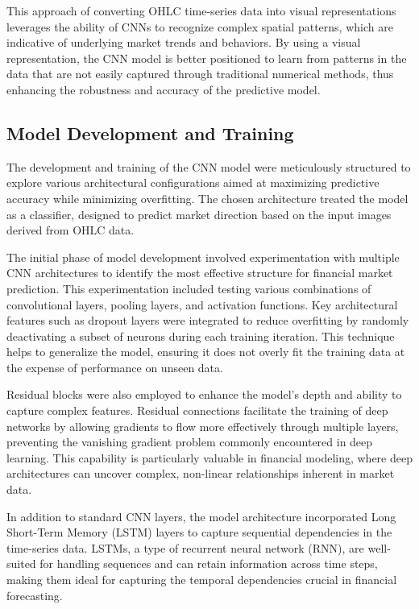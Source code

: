This approach of converting OHLC time-series data into visual representations leverages the ability of CNNs to recognize complex spatial patterns, which are indicative of underlying market trends and behaviors. By using a visual representation, the CNN model is better positioned to learn from patterns in the data that are not easily captured through traditional numerical methods, thus enhancing the robustness and accuracy of the predictive model.

\subsection{Model Development and Training}

The development and training of the CNN model were meticulously structured to explore various architectural configurations aimed at maximizing predictive accuracy while minimizing overfitting. The chosen architecture treated the model as a classifier, designed to predict market direction based on the input images derived from OHLC data.

The initial phase of model development involved experimentation with multiple CNN architectures to identify the most effective structure for financial market prediction. This experimentation included testing various combinations of convolutional layers, pooling layers, and activation functions. Key architectural features such as dropout layers were integrated to reduce overfitting by randomly deactivating a subset of neurons during each training iteration. This technique helps to generalize the model, ensuring it does not overly fit the training data at the expense of performance on unseen data.

Residual blocks were also employed to enhance the model's depth and ability to capture complex features. Residual connections facilitate the training of deep networks by allowing gradients to flow more effectively through multiple layers, preventing the vanishing gradient problem commonly encountered in deep learning. This capability is particularly valuable in financial modeling, where deep architectures can uncover complex, non-linear relationships inherent in market data.

In addition to standard CNN layers, the model architecture incorporated Long Short-Term Memory (LSTM) layers to capture sequential dependencies in the time-series data. LSTMs, a type of recurrent neural network (RNN), are well-suited for handling sequences and can retain information across time steps, making them ideal for capturing the temporal dependencies crucial in financial forecasting.

